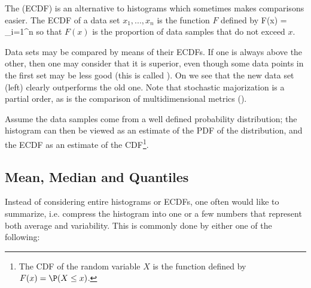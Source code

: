 \begin{figure}[htbp]
\begin{center}
  \end{center}
\end{figure}


The  (ECDF) is
an alternative to histograms which sometimes makes comparisons
easier. The ECDF of a data set $x_1, ...,x_n$ is the function
$F$ defined by
 \be
 F(x) = \sum_{i=1}^n 
  \ee
  so that $F(x)$ is the proportion of data samples that do not
  exceed $x$.

Data sets may be compared by means of their ECDFs. If one is
always above the other, then one may consider that it is
superior, even though some data points in the first set may be
less good (this is called ). On
 we see that the new data
  set (left)
  clearly outperforms the old one. Note that stochastic majorization is a
partial order, as is the comparison of multidimensional metrics
().

Assume the data samples come from
  a well defined probability distribution; the histogram can
  then be viewed as an estimate of the PDF of the distribution,
  and the ECDF as an estimate of the CDF\footnote{The
  CDF of the random variable $X$ is the function defined by
 $F(x)=\P(X \leq x)$.}.

  \begin{figure}[htbp]
\end{figure}



\subsection{Mean, Median and Quantiles}
Instead of considering entire histograms or ECDFs, one often
would like to summarize, i.e. compress the histogram into one
or a few numbers that represent both average and variability.
This is commonly done by either one of the following:

